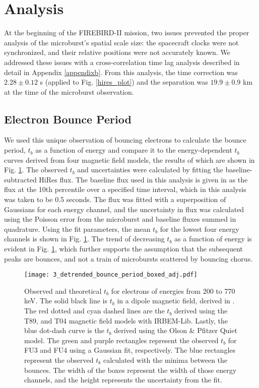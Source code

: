 \section{Analysis} \label{analysis} %
At the beginning of the FIREBIRD-II mission, two issues prevented the proper analysis of the microburst's spatial scale size: the spacecraft clocks were not synchronized, and their relative positions were not accurately known. We addressed these issues with a cross-correlation time lag analysis described in detail in Appendix \ref{appendixb}. From this analysis, the time correction was $2.28 \pm 0.12$ s (applied to Fig. \ref{hires_plot}) and the separation was $19.9 \pm 0.9$ km at the time of the microburst observation.

\subsection{Electron Bounce Period} \label{t_b} %
We used this unique observation of bouncing electrons to calculate the bounce period, $t_b$ as a function of energy and compare it to the energy-dependent $t_b$ curves derived from four magnetic field models, the results of which are shown in Fig. \ref{tb_plot}. The observed $t_b$ and uncertainties were calculated by fitting the baseline-subtracted HiRes flux. The baseline flux used in this analysis is given in \citet{O'Brien2004} as the flux at the 10th percentile over a specified time interval, which in this analysis was taken to be 0.5 seconds. The flux was fitted with a superposition of Gaussians for each energy channel, and the uncertainty in flux was calculated using the Poisson error from the microburst and baseline fluxes summed in quadrature. Using the fit parameters, the mean $t_b$ for the lowest four energy channels is shown in Fig. \ref{tb_plot}. The trend of decreasing $t_b$ as a function of energy is evident in Fig. \ref{tb_plot}, which further supports the assumption that the subsequent peaks are bounces, and not a train of microbursts scattered by bouncing chorus. 

\begin{figure}
\texttt{[image: 3\_detrended\_bounce\_period\_boxed\_adj.pdf]}
\caption{Observed and theoretical $t_b$ for electrons of energies from 200 to 770 keV. The solid black line is $t_b$ in a dipole magnetic field, derived in \citet{Schulz1974}. The red dotted and cyan dashed lines are the $t_b$ derived using the T89, and T04 magnetic field models with IRBEM-Lib. Lastly, the blue dot-dash curve is the $t_b$ derived using the Olson \& Pfitzer Quiet model. The green and purple rectangles represent the observed $t_b$ for FU3 and FU4 using a Gaussian fit, respectively. The blue rectangles represent the observed $t_b$ calculated with the minima between the bounces. The width of the boxes represent the width of those energy channels, and the height represents the uncertainty from the fit.}
\label{tb_plot}
\end{figure}

